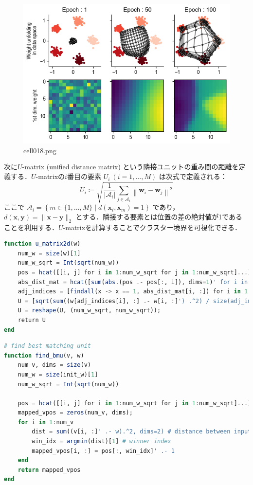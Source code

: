 \begin{figure}[ht]
	\centering
	\includegraphics[scale=0.8, max width=\linewidth]{./fig/local-learning-rule/self-organizing-map/cell018.png}
	\caption{cell018.png}
	\label{cell018.png}
\end{figure}
次に$U$-matrix (unified distance matrix) という隣接ユニットの重み間の距離を定義する．$U$-matrixの$i$番目の要素 $U_i\ (i=1, \ldots, M)$ は次式で定義される：
\begin{equation}
U_{i}\coloneqq \sqrt{\frac{1}{|\mathcal{A}_i|} \sum_{j \in \mathcal{A}_i} \left\|\mathbf{w}_{i} - \mathbf{w}_{j}\right\|^2}
\end{equation}
ここで $\mathcal{A}_i=\left\{m \in \{1, \ldots, M\} \mid d(\textbf{x}_i, \textbf{x}_m) = 1\right\}$ であり， $d(\mathbf{x}, \mathbf{y})=\|\mathbf{x} - \mathbf{y}\|_2$ とする．隣接する要素とは位置の差の絶対値が1であることを利用する．$U$-matrixを計算することでクラスター境界を可視化できる．
\begin{lstlisting}[language=julia]
function u_matrix2d(w)
    num_w = size(w)[1]
    num_w_sqrt = Int(sqrt(num_w))
    pos = hcat([[i, j] for i in 1:num_w_sqrt for j in 1:num_w_sqrt]...)
    abs_dist_mat = hcat([sum(abs.(pos .- pos[:, i]), dims=1)' for i in 1:num_w]...)
    adj_indices = [findall(x -> x == 1, abs_dist_mat[i, :]) for i in 1:num_w] # adjacent indices
    U = [sqrt(sum((w[adj_indices[i], :] .- w[i, :]') .^2) / size(adj_indices[i])[1]) for i in 1:num_w]
    U = reshape(U, (num_w_sqrt, num_w_sqrt));
    return U
end
\end{lstlisting}
\begin{lstlisting}[language=julia]
# find best matching unit
function find_bmu(v, w)
    num_v, dims = size(v)
    num_w = size(init_w)[1]
    num_w_sqrt = Int(sqrt(num_w))

    pos = hcat([[i, j] for i in 1:num_w_sqrt for j in 1:num_w_sqrt]...)
    mapped_vpos = zeros(num_v, dims);
    for i in 1:num_v
        dist = sum((v[i, :]' .- w).^2, dims=2) # distance between input and neurons
        win_idx = argmin(dist)[1] # winner index
        mapped_vpos[i, :] = pos[:, win_idx]' .- 1
    end
    return mapped_vpos
end
\end{lstlisting}
